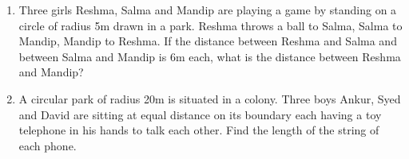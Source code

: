 \documentclass[journal,12pt,twocolumn]{IEEEtran}
\begin{document}
\begin{enumerate}
\item Three girls Reshma, Salma and Mandip are playing a game by standing on 
a circle of radius 5m drawn in a park. Reshma throws a ball to Salma, Salma to 
Mandip, Mandip to Reshma. If the distance between Reshma and Salma and between 
Salma and Mandip is 6m each, what is the distance between Reshma and Mandip?

\item A circular park of radius 20m is situated in a colony. Three boys Ankur,
Syed and David are sitting at equal distance on its boundary each having a toy 
telephone in his hands to talk each other. Find the length of the string of each 
phone.
\end{enumerate}
\end{document}
